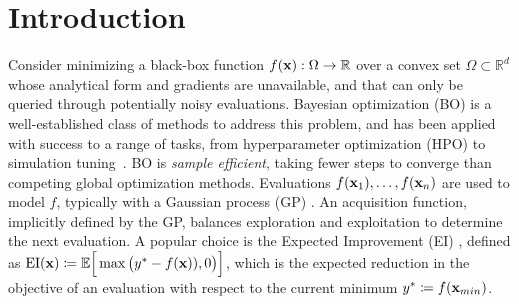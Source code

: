 \documentclass{article}
\newcommand{\E}{{\mathbb E}}
\newcommand{\EI}{{\text{EI}}}
\begin{document}
\begin{abstract}
Bayesian optimization (BO) is a class of global optimization algorithms, suitable for minimizing an expensive objective 
function in as few function evaluations as possible. While BO budgets are typically given in iterations, this implicitly measures convergence in terms of iteration count and assumes each evaluation has identical cost. In practice, evaluation costs may vary in different regions of the search space. For example, the cost of neural network training increases quadratically with layer size, which is a typical hyperparameter. \textit{Cost-aware BO} measures convergence with alternative cost metrics such as time, energy, or money, for which vanilla BO methods are unsuited. We introduce Cost Apportioned BO (CArBO), which attempts to minimize an objective function in as little cost as possible. %
CArBO combines a cost-effective initial design with a cost-cooled optimization phase which depreciates a learned cost model as iterations proceed. On a set of 20 black-box function optimization problems we show that, given the same cost budget, CArBO finds significantly better hyperparameter configurations than competing methods.
\end{abstract}

\section{Introduction}
Consider minimizing a black-box function $f({\mathbf x}): \Omega \rightarrow \mathbb{R}$ over a convex set $\Omega \subset \mathbb{R}^d$ whose analytical form and gradients are unavailable, and that can only be queried through potentially noisy evaluations. Bayesian optimization (BO) is a well-established class of methods to address this problem, and has been applied with success to a range of tasks, from hyperparameter optimization (HPO) to simulation tuning~\cite{Jones1998, snoek2012practical, Shahriari2016, ju2017designing, frazier2018}. BO is \textit{sample efficient}, taking fewer steps to converge than competing global optimization methods. Evaluations $f({\mathbf x}_1),\ldots,f({\mathbf x}_n)$ are used to model $f$, typically with a Gaussian process (GP) \citep{rasmussen2006gaussian}. An acquisition function, implicitly defined by the GP, balances exploration and exploitation to determine the next evaluation. A popular choice is the Expected Improvement (EI) \citep{Mockus1978}, defined as $\EI(\xb) \coloneqq \E \Big[  \max \big(y^* - f(\xb)), 0\big) \Big]$, which is the expected reduction in the objective of an evaluation with respect to the current minimum $ y^* \coloneqq f({\mathbf x}_{min})$.
\end{document}
